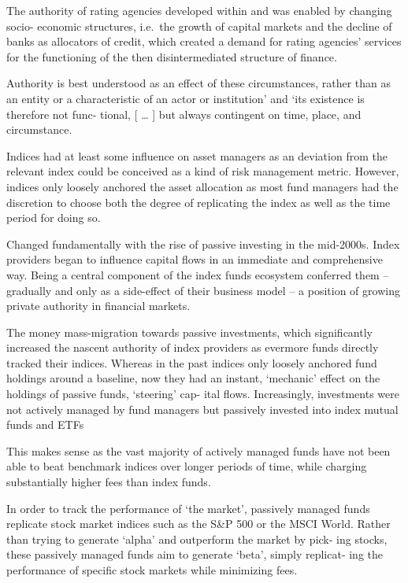 \documentclass[
]{book}
\begin{document}
The authority of rating agencies developed within and was enabled by changing socio-
economic structures, i.e.~the growth of capital markets and the decline of banks as
allocators of credit, which created a demand for rating agencies' services for the
functioning of the then disintermediated structure of finance.

Authority is best understood as an effect of these circumstances, rather than as an entity or a
characteristic of an actor or institution' and `its existence is therefore not func-
tional, {[} \ldots{} {]} but always contingent on time, place, and circumstance.

Indices had at least some influence on asset managers as an
deviation from the relevant index could be conceived as a kind of risk management
metric.
However, indices only loosely anchored the asset allocation as most fund
managers had the discretion to choose both the degree of replicating the index as
well as the time period for doing so.

Changed fundamentally with the rise of passive investing in the mid-2000s.
Index providers began to influence capital flows in an immediate and comprehensive way.
Being a central
component of the index funds ecosystem conferred them -- gradually and only as a
side-effect of their business model -- a position of growing private authority in
financial markets.

The money mass-migration
towards passive investments, which significantly increased the nascent authority
of index providers as evermore funds directly tracked their indices. Whereas in
the past indices only loosely anchored fund holdings around a baseline, now they
had an instant, `mechanic' effect on the holdings of passive funds, `steering' cap-
ital flows. Increasingly, investments were not actively managed by fund managers
but passively invested into index mutual funds and ETFs

This makes sense as the vast
majority of actively managed funds have not been able to beat benchmark indices
over longer periods of time, while charging substantially higher fees than index
funds.

In order to track the performance of `the market', passively
managed funds replicate stock market indices such as the S\&P 500 or the MSCI
World. Rather than trying to generate `alpha' and outperform the market by pick-
ing stocks, these passively managed funds aim to generate `beta', simply replicat-
ing the performance of specific stock markets while minimizing fees.
\end{document}
